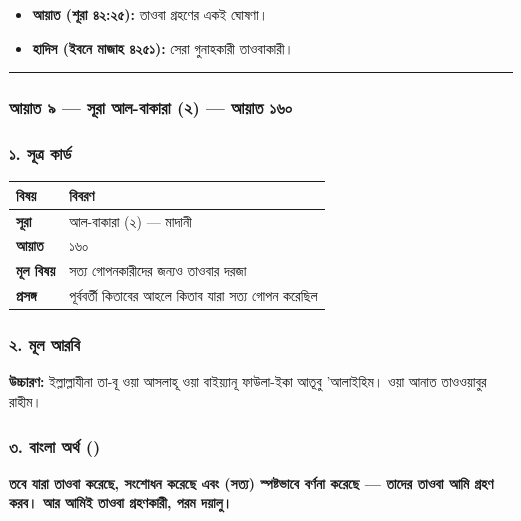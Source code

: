 \begin{itemize}
\item \textbf{আয়াত (শূরা ৪২:২৫):} তাওবা গ্রহণের একই ঘোষণা।
\item \textbf{হাদিস (ইবনে মাজাহ ৪২৫১):} সেরা গুনাহকারী তাওবাকারী।
\end{itemize}
\medskip\hrule\medskip

\subsubsection*{আয়াত ৯ — সূরা আল-বাকারা (২) — আয়াত ১৬০}

\subsubsection*{১. সূত্র কার্ড}

\begin{table}[h]\centering\small
\begin{tabular}{ll}
বিষয় & বিবরণ \\
\hline
\textbf{সূরা} & আল-বাকারা (২) — মাদানী \\
\textbf{আয়াত} & ১৬০ \\
\textbf{মূল বিষয়} & সত্য গোপনকারীদের জন্যও তাওবার দরজা \\
\textbf{প্রসঙ্গ} & পূর্ববর্তী কিতাবের আহলে কিতাব যারা সত্য গোপন করেছিল \\
\hline
\end{tabular}
\end{table}

\subsubsection*{২. মূল আরবি}

\begin{center}\end{center}
\textbf{উচ্চারণ:} ইল্লাল্লাযীনা তা-বূ ওয়া আসলাহূ ওয়া বাইয়্যানূ ফাউলা-ইকা আতূবু 'আলাইহিম। ওয়া আনাত তাওওয়াবুর রাহীম।

\subsubsection*{৩. বাংলা অর্থ ()}

\textbf{তবে যারা তাওবা করেছে, সংশোধন করেছে এবং (সত্য) স্পষ্টভাবে বর্ণনা করেছে — তাদের তাওবা আমি গ্রহণ করব। আর আমিই তাওবা গ্রহণকারী, পরম দয়ালু।}

